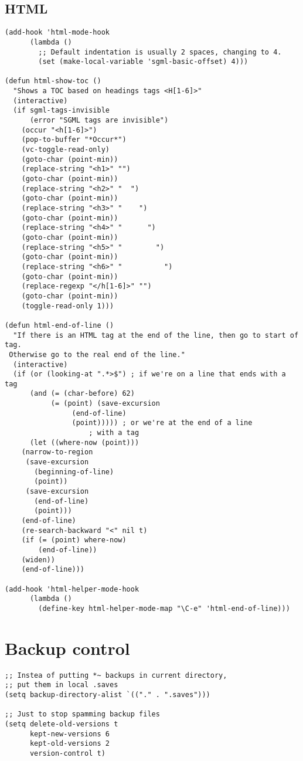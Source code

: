 \documentclass[11pt]{article}
\begin{document}
\subsection{HTML}
\label{sec:org98291e7}
\begin{verbatim}
(add-hook 'html-mode-hook
	  (lambda ()
	    ;; Default indentation is usually 2 spaces, changing to 4.
	    (set (make-local-variable 'sgml-basic-offset) 4)))

(defun html-show-toc ()
  "Shows a TOC based on headings tags <H[1-6]>"
  (interactive)
  (if sgml-tags-invisible
      (error "SGML tags are invisible")
    (occur "<h[1-6]>")
    (pop-to-buffer "*Occur*")
    (vc-toggle-read-only)
    (goto-char (point-min))
    (replace-string "<h1>" "")
    (goto-char (point-min))
    (replace-string "<h2>" "  ")
    (goto-char (point-min))
    (replace-string "<h3>" "    ")
    (goto-char (point-min))
    (replace-string "<h4>" "      ")
    (goto-char (point-min))
    (replace-string "<h5>" "        ")
    (goto-char (point-min))
    (replace-string "<h6>" "          ")
    (goto-char (point-min))
    (replace-regexp "</h[1-6]>" "")
    (goto-char (point-min))
    (toggle-read-only 1)))

(defun html-end-of-line ()
  "If there is an HTML tag at the end of the line, then go to start of tag.
 Otherwise go to the real end of the line."
  (interactive)
  (if (or (looking-at ".*>$") ; if we're on a line that ends with a tag
	  (and (= (char-before) 62)
	       (= (point) (save-excursion
			    (end-of-line)
			    (point))))) ; or we're at the end of a line
					; with a tag
      (let ((where-now (point)))
	(narrow-to-region
	 (save-excursion
	   (beginning-of-line)
	   (point))
	 (save-excursion
	   (end-of-line)
	   (point)))
	(end-of-line)
	(re-search-backward "<" nil t)
	(if (= (point) where-now)
	    (end-of-line))
	(widen))
    (end-of-line)))

(add-hook 'html-helper-mode-hook
	  (lambda ()
	    (define-key html-helper-mode-map "\C-e" 'html-end-of-line)))
\end{verbatim}
\section{Backup control}
\label{sec:org16d6463}
\begin{verbatim}
;; Instea of putting *~ backups in current directory,
;; put them in local .saves
(setq backup-directory-alist `(("." . ".saves")))

;; Just to stop spamming backup files
(setq delete-old-versions t
      kept-new-versions 6
      kept-old-versions 2
      version-control t)
\end{verbatim}
\end{document}
